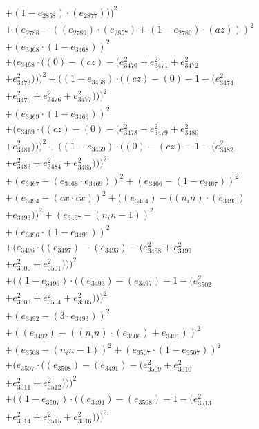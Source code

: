 \documentclass[10pt, a4paper]{article}
\begin{document}
\begin{small}
\begin{align*}
& + (1 - e_{2858})  \cdot  (e_{2877})))^{2} \\
& + (e_{2788} - ((e_{2789})  \cdot  (e_{2857}) + (1 - e_{2789})  \cdot  (az)))^{2} \\
& + (e_{3468}  \cdot  (1 - e_{3468}))^{2} \\
& + (e_{3468}  \cdot  ((0) - (cz) - (e_{3470}^{2} + e_{3471}^{2} + e_{3472}^{2} \\
& + e_{3473}^{2})))^{2} + ((1 - e_{3468})  \cdot  ((cz) - (0) - 1 - (e_{3474}^{2} \\
& + e_{3475}^{2} + e_{3476}^{2} + e_{3477}^{2})))^{2} \\
& + (e_{3469}  \cdot  (1 - e_{3469}))^{2} \\
& + (e_{3469}  \cdot  ((cz) - (0) - (e_{3478}^{2} + e_{3479}^{2} + e_{3480}^{2} \\
& + e_{3481}^{2})))^{2} + ((1 - e_{3469})  \cdot  ((0) - (cz) - 1 - (e_{3482}^{2} \\
& + e_{3483}^{2} + e_{3484}^{2} + e_{3485}^{2})))^{2} \\
& + (e_{3467} - (e_{3468}  \cdot  e_{3469}))^{2} + (e_{3466} - (1 - e_{3467}))^{2} \\
& + (e_{3494} - (cx  \cdot  cx))^{2} + ((e_{3494}) - ((n_in)  \cdot  (e_{3495}) \\
& + e_{3493}))^{2} + (e_{3497} - (n_in - 1))^{2} \\
& + (e_{3496}  \cdot  (1 - e_{3496}))^{2} \\
& + (e_{3496}  \cdot  ((e_{3497}) - (e_{3493}) - (e_{3498}^{2} + e_{3499}^{2} \\
& + e_{3500}^{2} + e_{3501}^{2})))^{2} \\
& + ((1 - e_{3496})  \cdot  ((e_{3493}) - (e_{3497}) - 1 - (e_{3502}^{2} \\
& + e_{3503}^{2} + e_{3504}^{2} + e_{3505}^{2})))^{2} \\
& + (e_{3492} - (3  \cdot  e_{3493}))^{2} \\
& + ((e_{3492}) - ((n_in)  \cdot  (e_{3506}) + e_{3491}))^{2} \\
& + (e_{3508} - (n_in - 1))^{2} + (e_{3507}  \cdot  (1 - e_{3507}))^{2} \\
& + (e_{3507}  \cdot  ((e_{3508}) - (e_{3491}) - (e_{3509}^{2} + e_{3510}^{2} \\
& + e_{3511}^{2} + e_{3512}^{2})))^{2} \\
& + ((1 - e_{3507})  \cdot  ((e_{3491}) - (e_{3508}) - 1 - (e_{3513}^{2} \\
& + e_{3514}^{2} + e_{3515}^{2} + e_{3516}^{2})))^{2} \\

\end{align*}
\end{small}
\end{document}
